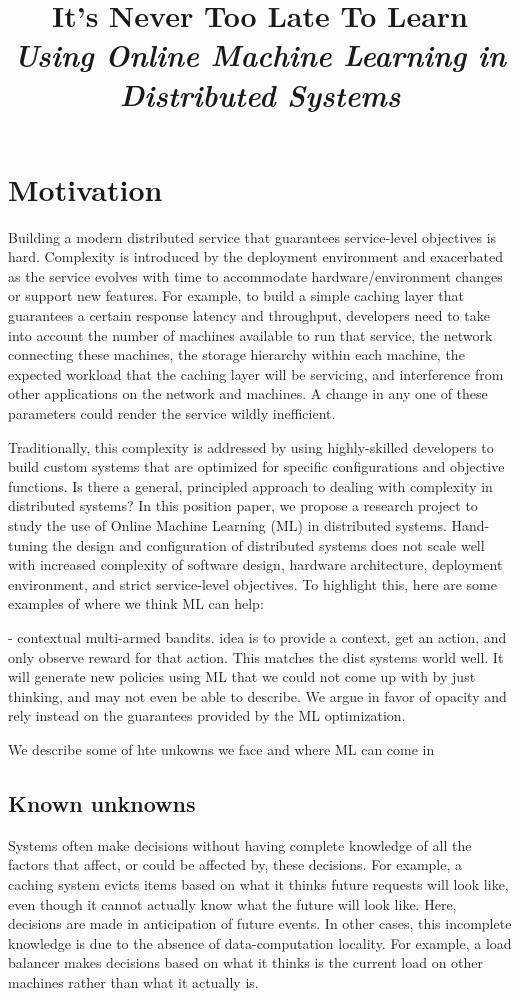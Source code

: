 \documentclass[a4paper,twocolumn]{article}
\title{
  It's Never Too Late To Learn\\
  \emph{Using Online Machine Learning in Distributed Systems}
}
\author{}
\date{}
\begin{document}
\maketitle

\section{Motivation}

Building a modern distributed service that guarantees service-level objectives
is hard. Complexity is introduced by the deployment environment and exacerbated
as the service evolves with time to accommodate hardware/environment changes or
support new features.
For example, to build a simple caching layer that guarantees a certain response
latency and throughput, developers need to take into account the number of
machines available to run that service, the network connecting these machines,
the storage hierarchy within each machine, the expected workload that the
caching layer will be servicing, and interference from other applications on the
network and machines.  A change in any one of these parameters could render the
service wildly inefficient.

Traditionally, this complexity is addressed by using highly-skilled developers
to build custom systems that are optimized for specific configurations and
objective functions.  Is there a general, principled approach to dealing with
complexity in distributed systems?
In this position paper, we propose a research project to study the use of Online
Machine Learning (ML) in distributed systems.  Hand-tuning the design and
configuration of distributed systems does not scale well with increased
complexity of software design, hardware architecture, deployment environment,
and strict service-level objectives.
To highlight this, here are some examples of where we think ML can help:

- contextual multi-armed bandits. idea is to provide a context, get an action,
and only observe reward for that action. This matches the dist systems world well. It will generate new
policies using ML that we could not come up with by just thinking, and may not
even be able to describe. We argue in favor of opacity and rely instead on the guarantees
provided by the ML optimization.

We describe some of hte unkowns we face and where ML can come in


\subsection*{Known unknowns}
Systems often make decisions without having complete knowledge of all the
factors that affect, or could be affected by, these decisions.  For example, a
caching system evicts items based on what it thinks future requests will look
like, even though it cannot actually know what the future will look like. Here,
decisions are made in anticipation of future events.  In other cases, this
incomplete knowledge is due to the absence of data-computation locality. For
example, a load balancer makes decisions based on what it thinks is the current
load on other machines rather than what it actually is.
\end{document}
